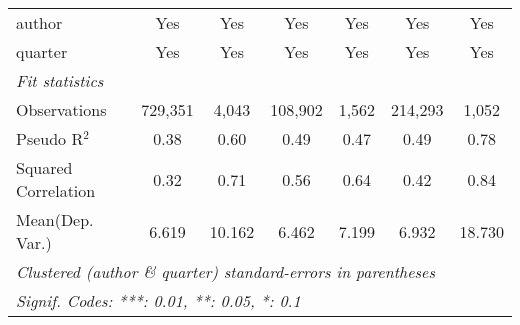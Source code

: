 \begin{tabular}{lcccccc}
   author                                                     & Yes            & Yes           & Yes            & Yes          & Yes          & Yes\\  
   quarter                                                    & Yes            & Yes           & Yes            & Yes          & Yes          & Yes\\  
   \midrule
   \emph{Fit statistics}\\
   Observations                                               & 729,351        & 4,043         & 108,902        & 1,562        & 214,293      & 1,052\\  
   Pseudo R$^2$                                               & 0.38           & 0.60          & 0.49           & 0.47         & 0.49         & 0.78\\  
   Squared Correlation                                        & 0.32           & 0.71          & 0.56           & 0.64         & 0.42         & 0.84\\  
Mean(Dep. Var.) & 6.619 & 10.162 & 6.462 & 7.199 & 6.932 & 18.730 \\
   \midrule \midrule
   \multicolumn{7}{l}{\emph{Clustered (author \& quarter) standard-errors in parentheses}}\\
   \multicolumn{7}{l}{\emph{Signif. Codes: ***: 0.01, **: 0.05, *: 0.1}}\\
\end{tabular}
\par\endgroup
